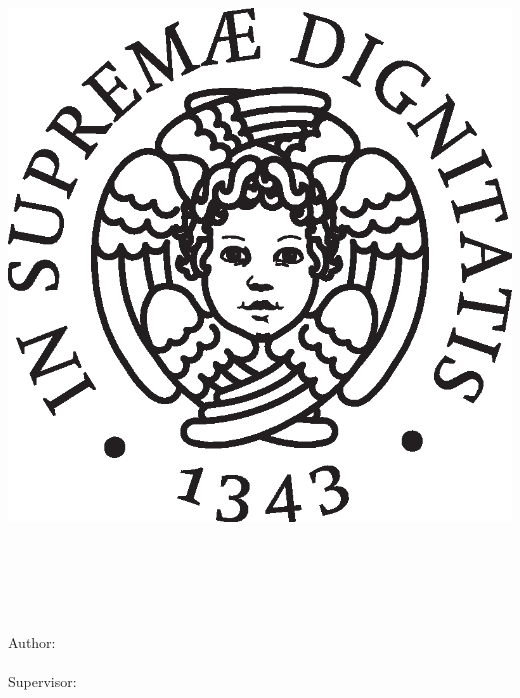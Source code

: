 \begin{titlepage}
  \begin{addmargin}[-1cm]{-1cm}
    \centering

    \hfill
    \vfill
    \includegraphics[width=0.35\columnwidth]{gfx/cherubino_black.eps}\\
    \bigskip
    \large
    \spacedlowsmallcaps{\myUni} \\
    \smallskip\emph{\myDepartment} \\
    \smallskip\myDegree \\

    \noindent\makebox[\linewidth]{\rule{\linewidth}{1pt}}
    \bigskip

    \begingroup
      \LARGE
      {\color{CTtitle}\spacedallcaps{\myTitle}} \\
    \endgroup

    \vfill

    \flushright
    \normalsize{Author:}\\
    \smallskip\spacedlowsmallcaps{\myName}\\

    \flushleft
    \normalsize{Supervisor:}\\
    \smallskip\spacedlowsmallcaps{\mySupervisor}\\

    \vfill

    \centering
    \myAcademicYear
  \end{addmargin}       
\end{titlepage}
